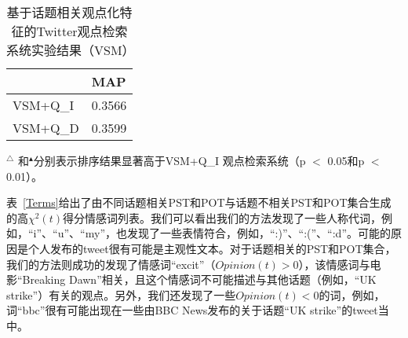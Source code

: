 \begin{table}
    \caption{基于话题相关观点化特征的Twitter观点检索系统实验结果（VSM）}
     \label{QDVSM}
 \centering
 \begin{tabular}{|l l|}
 \hline
 & MAP \\
 \hline
VSM+Q\_I&0.3566\\
VSM+Q\_D&0.3599\\
 \hline
 \end{tabular}
      \begin{tablenotes}
        \footnotesize
\item $^\triangle$ 和$^\blacktriangle$分别表示排序结果显著高于VSM+Q\_I 观点检索系统（p $<$ 0.05和p $<$ 0.01）。
\end{tablenotes}
\end{table}



表~\ref{Terms}给出了由不同话题相关PST和POT与话题不相关PST和POT集合生成的高$\chi^{2}(t)$得分情感词列表。我们可以看出我们的方法发现了一些人称代词，例如，“i”、“u”、“my”，也发现了一些表情符合，例如，“:)”、“:(”、“:d”。可能的原因是个人发布的tweet很有可能是主观性文本。对于话题相关的PST和POT集合，我们的方法则成功的发现了情感词“excit”（$Opinion(t)>0$），该情感词与电影“Breaking Dawn”相关，且这个情感词不可能描述与其他话题（例如，“UK strike”）有关的观点。另外，我们还发现了一些$Opinion(t)<0$的词，例如，词“bbc”很有可能出现在一些由BBC News发布的关于话题“UK strike”的tweet当中。


